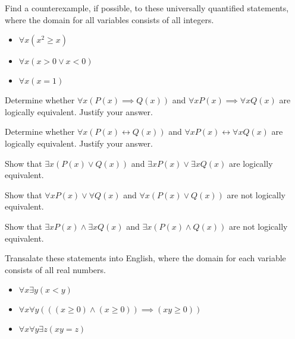\documentclass{article}
\newenvironment{problem}[2][Problem]{\begin{trivlist}
\item[\hskip \labelsep {\bfseries #1}\hskip \labelsep {\bfseries #2.}]}{\end{trivlist}}
\begin{document}
\begin{problem}{8}
Find a counterexample, if possible, to these universally quantified statements, where the domain for all variables consists of all integers.
\begin{itemize}
    \item[(a)] $\forall x (x^2 \geq x)$
    \item[(b)] $\forall x (x >0 \lor x<0)$
    \item[(c)] $\forall x ( x = 1) $
\end{itemize}
\end{problem}

\begin{problem}{9}
Determine whether $\forall x (P(x) \implies Q(x))$ and $\forall x P(x) \implies \forall x Q(x)$ are logically equivalent. Justify your answer.
\end{problem}

\begin{problem}{10}
Determine whether $\forall x (P(x) \leftrightarrow Q(x))$ and $\forall x P(x) \leftrightarrow \forall x Q(x)$ are logically equivalent. Justify your answer.
\end{problem}

\begin{problem}{11}
Show that  $\exists x (P(x) \lor Q(x))$ and $\exists x P(x) \lor \exists x Q(x)$ are logically equivalent.
\end{problem}

\begin{problem}{12}
Show that  $\forall x P(x) \lor \forall Q(x)$ and $\forall x (P(x) \lor Q(x))$ are not logically equivalent.
\end{problem}

\begin{problem}{13}
Show that  $\exists x P(x) \land \exists x Q(x)$ and $\exists x (P(x) \land Q(x))$ are not logically equivalent.
\end{problem}

\begin{problem}{14}
Transalate these statements into English, where the domain for each variable consists of all real numbers.
\begin{itemize}
    \item[(a)] $\forall x \exists y (x < y) $
    \item[(b)] $\forall x \forall y (((x \geq 0) \land (x \geq 0) ) \implies (xy \geq 0)) $
    \item[(c)] $\forall x \forall y \exists z (xy=z) $
\end{itemize}
\end{problem}
\end{document}

